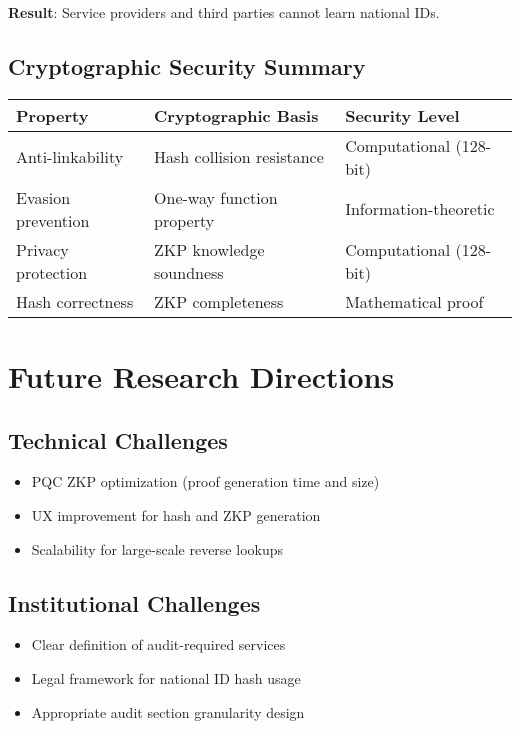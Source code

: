 \textbf{Result}: Service providers and third parties cannot learn national IDs.

\subsection{Cryptographic Security Summary}

\begin{table}[h]
\centering
\begin{tabular}{|l|l|l|}
\hline
\textbf{Property} & \textbf{Cryptographic Basis} & \textbf{Security Level} \\
\hline
Anti-linkability & Hash collision resistance & Computational (128-bit) \\
Evasion prevention & One-way function property & Information-theoretic \\
Privacy protection & ZKP knowledge soundness & Computational (128-bit) \\
Hash correctness & ZKP completeness & Mathematical proof \\
\hline
\end{tabular}
\end{table}

\section{Future Research Directions}

\subsection{Technical Challenges}

\begin{itemize}
  \item PQC ZKP optimization (proof generation time and size)
  \item UX improvement for hash and ZKP generation
  \item Scalability for large-scale reverse lookups
\end{itemize}

\subsection{Institutional Challenges}

\begin{itemize}
  \item Clear definition of audit-required services
  \item Legal framework for national ID hash usage
  \item Appropriate audit section granularity design
\end{itemize}

